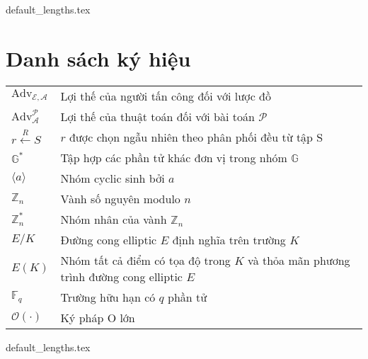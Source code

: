 \documentclass[class=report, crop=false]{standalone}
\begin{document}
	{default_lengths.tex}
	\baselineskip
	\chapter*{Danh sách ký hiệu}
	\begin{tabu}{>{\large}p{2cm} >{\large}X[l]}
		$\text{Adv}_\mathcal{E, A}$ 			& 	Lợi thế của người tấn công \adversary đối với lược đồ \scheme 							\\
		$\text{Adv}_\mathcal{A}^\mathcal{P}$ 	& 	Lợi thế của thuật toán \algo đối với bài toán $\mathcal{P}$ 							\\
		$r \xleftarrow{R} S$ 					& 	$r$ được chọn ngẫu nhiên theo phân phối đều từ tập S 									\\
		$\mathbb{G}^*$							& 	Tập hợp các phần tử khác đơn vị trong nhóm $\mathbb{G}$ 							\\
		$\langle a \rangle$ 					& 	Nhóm cyclic sinh bởi $a$ 																\\
		$\mathbb{Z}_n$							& 	Vành số nguyên modulo $n$ 																\\
		$\mathbb{Z}_n^*$						& 	Nhóm nhân của vành $\mathbb{Z}_n$ 														\\
		$E/K$									&	Đường cong elliptic $E$ định nghĩa trên trường $K$ 										\\
		$E(K)$									&	Nhóm tất cả điểm có tọa độ trong $K$ và thỏa mãn phương trình đường cong elliptic $E$ 	\\
		$\mathbb{F}_q$							&	Trường hữu hạn có $q$ phần tử 															\\
		$\mathcal{O}(\cdot)$					& 	Ký pháp O lớn																			\\

	\end{tabu}
	\newpage
	{default_lengths.tex}
\end{document}
